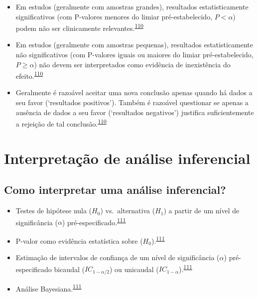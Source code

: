 \documentclass[
  a4paper,
]{book}
\begin{document}
\begin{itemize}
\item
  Em estudos (geralmente com amostras grandes), resultados estatisticamente significativos (com P-valores menores do limiar pré-estabelecido, \(P<\alpha\)) podem não ser clinicamente relevantes.\textsuperscript{\protect\hyperlink{ref-altman1995}{110}}
\item
  Em estudos (geralmente com amostras pequenas), resultados estatisticamente não significativos (com P-valores iguais ou maiores do limiar pré-estabelecido, \(P≥\alpha\)) não devem ser interpretados como evidência de inexistência do efeito.\textsuperscript{\protect\hyperlink{ref-altman1995}{110}}
\item
  Geralmente é razoável aceitar uma nova conclusão apenas quando há dados a seu favor (`resultados positivos'). Também é razoável questionar se apenas a ausência de dados a seu favor (`resultados negativos') justifica suficientemente a rejeição de tal conclusão.\textsuperscript{\protect\hyperlink{ref-altman1995}{110}}
\end{itemize}

\hypertarget{interpretauxe7uxe3o-de-anuxe1lise-inferencial}{%
\section{Interpretação de análise inferencial}\label{interpretauxe7uxe3o-de-anuxe1lise-inferencial}}

\hypertarget{como-interpretar-uma-anuxe1lise-inferencial}{%
\subsection{Como interpretar uma análise inferencial?}\label{como-interpretar-uma-anuxe1lise-inferencial}}

\begin{itemize}
\item
  Testes de hipótese nula (\(H_{0}\)) vs.~alternativa (\(H_{1}\)) a partir de um nível de significância (\(\alpha\)) pré-especificado.\textsuperscript{\protect\hyperlink{ref-goodman2016}{111}}
\item
  P-valor como evidência estatística sobre (\(H_{0}\)).\textsuperscript{\protect\hyperlink{ref-goodman2016}{111}}
\item
  Estimação de intervalos de confiança de um nível de significância (\(\alpha\)) pré-especificado bicaudal (\(IC_{1-\alpha/2}\)) ou unicaudal (\(IC_{1-\alpha}\)).\textsuperscript{\protect\hyperlink{ref-goodman2016}{111}}
\item
  Análise Bayesiana.\textsuperscript{\protect\hyperlink{ref-goodman2016}{111}}
\end{itemize}
\end{document}
